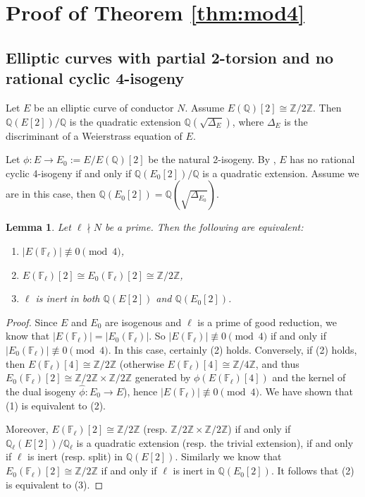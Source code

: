 \documentclass[11pt]{amsart}
\newtheorem{lemma}[theorem]{Lemma}
\theoremstyle{definition}
\begin{document}
\section{Proof of Theorem \ref{thm:mod4}} 
\subsection{Elliptic curves with partial 2-torsion and no rational cyclic 4-isogeny}

Let $E$ be an elliptic curve of conductor $N$. Assume $E(\mathbb{Q})[2]\cong \mathbb{Z}/2 \mathbb{Z}$. Then $\mathbb{Q}(E[2])/\mathbb{Q}$ is the quadratic extension $\mathbb{Q}(\sqrt{\Delta_E})$, where $\Delta_E$ is the discriminant of a Weierstrass equation of $E$.

Let $\phi: E\rightarrow E_0:=E/E(\mathbb{Q})[2]$ be the natural 2-isogeny. By \cite[Lem. 4.2 (i)]{Klagsbrun2017}, $E$ has no rational cyclic 4-isogeny if and only if $\mathbb{Q}(E_0[2])/\mathbb{Q}$ is a quadratic extension. Assume we are in this case, then $\mathbb{Q}(E_0[2])=\mathbb{Q}(\sqrt{\Delta_{E_0}})$.


\begin{lemma}\label{lem:mod4}
Let $\ell\nmid N$ be a prime. Then the following are equivalent:
  \begin{enumerate}
  \item   $|E(\mathbb{F}_\ell)|\not\equiv0\pmod{4}$,
  \item $E(\mathbb{F}_\ell)[2]\cong E_0(\mathbb{F}_\ell)[2]\cong \mathbb{Z}/2 \mathbb{Z}$,
  \item $\ell$ is inert in both $\mathbb{Q}(E[2])$ and $\mathbb{Q}(E_0[2])$.
  \end{enumerate}
\end{lemma}

\begin{proof}
  Since $E$ and $E_0$ are isogenous and $\ell$ is a prime of good reduction, we know that $|E(\mathbb{F}_\ell)|=|E_0(\mathbb{F}_\ell)|$. So $|E(\mathbb{F}_\ell)|\not\equiv0\pmod{4}$ if and only if $|E_0(\mathbb{F}_\ell)|\not\equiv0\pmod{4}$. In this case, certainly (2) holds. Conversely, if (2) holds, then $E(\mathbb{F}_\ell)[4]\cong \mathbb{Z}/2 \mathbb{Z}$ (otherwise $E(\mathbb{F}_\ell)[4]\cong \mathbb{Z}/4 \mathbb{Z}$, and thus $E_0(\mathbb{F}_\ell)[2]\cong \mathbb{Z}/2 \mathbb{Z}\times \mathbb{Z}/2 \mathbb{Z}$ generated by $\phi(E(\mathbb{F}_\ell)[4])$ and the kernel of the dual isogeny $\hat\phi:E_0\rightarrow E$), hence $|E(\mathbb{F}_\ell)|\not\equiv0\pmod{4}$. We have shown that (1) is equivalent to (2).
  
  Moreover, $E(\mathbb{F}_\ell)[2]\cong \mathbb{Z}/2 \mathbb{Z}$ (resp. $\mathbb{Z}/2 \mathbb{Z}\times \mathbb{Z}/2 \mathbb{Z}$) if and only if $\mathbb{Q}_\ell(E[2])/\mathbb{Q}_\ell$ is a quadratic extension (resp. the trivial extension), if and only if $\ell$ is inert (resp. split) in $\mathbb{Q}(E[2])$. Similarly we know that $E_0(\mathbb{F}_\ell)[2]\cong \mathbb{Z}/2 \mathbb{Z}$ if and only if  $\ell$ is inert in $\mathbb{Q}(E_0[2])$. It follows that (2) is equivalent to (3).
\end{proof}
\end{document}
